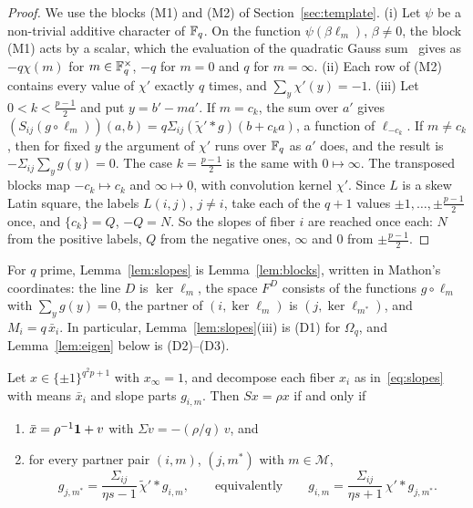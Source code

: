 \begin{proof}
We use the blocks (M1) and (M2) of Section~\ref{sec:template}.
(i) Let $\psi$ be a non-trivial additive character of $\mathbb{F}_q$. On the function $\psi(\beta\ell_m)$, $\beta\ne0$, the block (M1) acts by a scalar, which the evaluation of the quadratic Gauss sum~\cite[Theorem~5.15]{LidlNiederreiter} gives as $-q\chi(m)$ for $m\in\mathbb{F}_q^\times$, $-q$ for $m=0$ and $q$ for $m=\infty$.
(ii) Each row of (M2) contains every value of $\chi'$ exactly $q$ times, and $\sum_y\chi'(y)=-1$.
(iii) Let $0<k<\tfrac{p-1}2$ and put $y=b'-ma'$.
If $m=c_k$, the sum over $a'$ gives $(S_{ij}(g\circ\ell_m))(a,b)=q\Sigma_{ij}(\tilde\chi'*g)(b+c_ka)$, a function of $\ell_{-c_k}$.
If $m\ne c_k$, then for fixed $y$ the argument of $\chi'$ runs over $\mathbb{F}_q$ as $a'$ does, and the result is $-\Sigma_{ij}\sum_yg(y)=0$.
The case $k=\tfrac{p-1}2$ is the same with $0\mapsto\infty$.
The transposed blocks map $-c_k\mapsto c_k$ and $\infty\mapsto0$, with convolution kernel $\chi'$.
Since $L$ is a skew Latin square, the labels $L(i,j)$, $j\ne i$, take each of the $q+1$ values $\pm1,\dots,\pm\tfrac{p-1}2$ once, and $\{c_k\}=Q$, $-Q=N$.
So the slopes of fiber $i$ are reached once each: $N$ from the positive labels, $Q$ from the negative ones, $\infty$ and $0$ from $\pm\tfrac{p-1}2$.
\end{proof}

For $q$ prime, Lemma~\ref{lem:slopes} is Lemma~\ref{lem:blocks}, written in
Mathon's coordinates: the line $D$ is $\ker\ell_m$, the space $F^D$ consists of the functions $g\circ\ell_m$ with
$\sum_yg(y)=0$, the partner of $(i,\ker\ell_m)$ is $(j,\ker\ell_{m^*})$, and $M_i=q\,\bar x_i$. In particular,
Lemma~\ref{lem:slopes}(iii) is (D1) for $\Omega_q$, and Lemma~\ref{lem:eigen} below is (D2)--(D3).

\begin{lemma}\label{lem:eigen}
Let $x\in\{\pm1\}^{q^2p+1}$ with $x_\infty=1$, and decompose each fiber $x_i$ as in~\eqref{eq:slopes} with means $\bar x_i$ and slope parts $g_{i,m}$.
Then $Sx=\rho x$ if and only if
\begin{enumerate}
\item[(M)] $\bar x=\rho^{-1}\mathbf 1+v$ with $\Sigma v=-(\rho/q)\,v$, and
\item[(P)] for every partner pair $(i,m)$, $(j,m^*)$ with $m\in\mathcal M$,
\[
g_{j,m^*}=\frac{\Sigma_{ij}}{\eta s-1}\,\tilde\chi'*g_{i,m},\qquad\text{equivalently}\qquad g_{i,m}=\frac{\Sigma_{ij}}{\eta s+1}\,\chi'*g_{j,m^*}.
\]
\end{enumerate}
\end{lemma}

